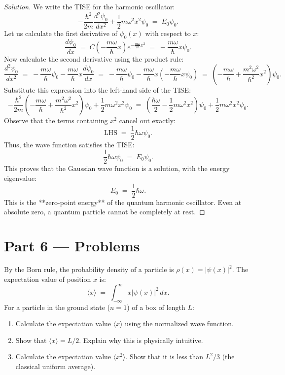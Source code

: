 \documentclass[12pt, a4paper, twoside]{book}
\newcounter{problem}[chapter]
\begin{document}
\begin{proof}[Solution]
We write the TISE for the harmonic oscillator:
\[
  -\frac{\hbar^2}{2m} \frac{d^2 \psi_0}{dx^2} + \frac{1}{2}m\omega^2 x^2 \psi_0 \;=\; E_0 \psi_0.
\]
Let us calculate the first derivative of $\psi_0(x)$ with respect to $x$:
\[
  \frac{d\psi_0}{dx} \;=\; C \left( -\frac{m\omega}{\hbar} x \right) e^{-\frac{m\omega}{2\hbar} x^2} \;=\; -\frac{m\omega}{\hbar} x \psi_0.
\]
Now calculate the second derivative using the product rule:
\[
  \frac{d^2 \psi_0}{dx^2} \;=\; -\frac{m\omega}{\hbar} \psi_0 - \frac{m\omega}{\hbar} x \frac{d\psi_0}{dx} \;=\; -\frac{m\omega}{\hbar} \psi_0 - \frac{m\omega}{\hbar} x \left( -\frac{m\omega}{\hbar} x \psi_0 \right) \;=\; \left( -\frac{m\omega}{\hbar} + \frac{m^2\omega^2}{\hbar^2} x^2 \right) \psi_0.
\]
Substitute this expression into the left-hand side of the TISE:
\[
  -\frac{\hbar^2}{2m} \left( -\frac{m\omega}{\hbar} + \frac{m^2\omega^2}{\hbar^2} x^2 \right) \psi_0 + \frac{1}{2}m\omega^2 x^2 \psi_0 \;=\; \left( \frac{\hbar\omega}{2} - \frac{1}{2}m\omega^2 x^2 \right) \psi_0 + \frac{1}{2}m\omega^2 x^2 \psi_0.
\]
Observe that the terms containing $x^2$ cancel out exactly:
\[
  \text{LHS} \;=\; \frac{1}{2}\hbar\omega \psi_0.
\]
Thus, the wave function satisfies the TISE:
\[
  \frac{1}{2}\hbar\omega \psi_0 \;=\; E_0 \psi_0.
\]
This proves that the Gaussian wave function is a solution, with the energy eigenvalue:
\[
  E_0 \;=\; \frac{1}{2}\hbar\omega.
\]
This is the **zero-point energy** of the quantum harmonic oscillator. Even at absolute zero, a quantum particle cannot be completely at rest.
\end{proof}

\newpage

\section{Part 6 --- Problems}

\begin{problem}
By the Born rule, the probability density of a particle is $\rho(x) = |\psi(x)|^2$. The expectation value of position $x$ is:
\[
  \langle x \rangle \;=\; \int_{-\infty}^\infty x |\psi(x)|^2 \, dx.
\]
For a particle in the ground state ($n=1$) of a box of length $L$:
\begin{enumerate}[label=(\alph*)]
  \item Calculate the expectation value $\langle x \rangle$ using the normalized wave function.
  \item Show that $\langle x \rangle = L/2$. Explain why this is physically intuitive.
  \item Calculate the expectation value $\langle x^2 \rangle$. Show that it is less than $L^2/3$ (the classical uniform average).
\end{enumerate}
\end{problem}
\end{document}
